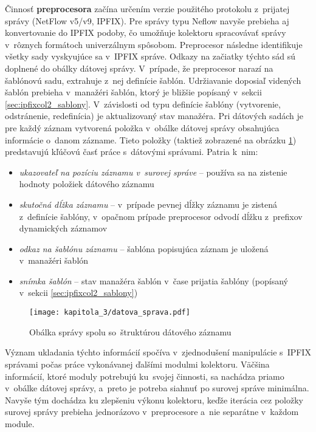 Činnosť \textbf{preprocesora} začína určením verzie použitého protokolu z~prijatej správy (Net\-Flow v5/v9, IPFIX). Pre správy typu Neflow navyše prebieha aj konvertovanie do IPFIX podoby, čo umožňuje kolektoru spracovávať správy v~rôznych formátoch univerzálnym spôsobom.
Preprocesor následne identifikuje všetky sady vyskyujúce sa v~IPFIX správe. Odkazy na začiatky týchto sád sú doplnené do obálky dátovej správy. V~prípade, že preprocesor narazí na šablónovú sadu, extrahuje z~nej definície šablón. Udržiavanie doposiaľ videných
šablón prebieha v~manažéri šablón, ktorý je bližšie popísaný v~sekcii \ref{sec:ipfixcol2_sablony}. V~závislosti od typu definície šablóny (vytvorenie, odstránenie, redefinícia) je aktualizovaný stav manažéra. Pri dátových sadách je pre každý záznam vytvorená položka v~obálke
dátovej správy obsahujúca informácie o~danom zázname. Tieto položky (taktiež zobrazené na obrázku \ref{datova_sprava}) predstavujú kľúčovú časť práce s~dátovými správami. Patria k~nim:

\begin{itemize}
    \setlength\itemsep{-0.5em}
    \item \textit{ukazovateľ na pozíciu záznamu v~surovej správe} -- používa sa na zistenie hodnoty položiek dátového záznamu
    \item \textit{skutočná dĺžka záznamu} -- v~prípade pevnej dĺžky záznamu je zistená z~definície šablóny, v~opačnom prípade preprocesor odvodí dĺžku z~prefixov dynamických záznamov
    \item \textit{odkaz na šablónu záznamu} -- šablóna popisujúca záznam je uložená v~manažéri šablón
    \item \textit{snímka šablón} -- stav manažéra šablón v~čase prijatia šablóny (popísaný v~sekcii \ref{sec:ipfixcol2_sablony})
\end{itemize}

\begin{figure}[ht]
    \centering
    \texttt{[image: kapitola\_3/datova\_sprava.pdf]}
    \caption{Obálka správy spolu so~štruktúrou dátového záznamu}
    \label{datova_sprava}
\end{figure}

Význam ukladania týchto informácií spočíva v~zjednodušení manipulácie s~IPFIX správami počas práce vykonávanej ďalšími modulmi kolektoru. Väčšina informácií, ktoré moduly potrebujú ku~svojej činnosti, sa nachádza priamo v~obálke dátovej správy, a~preto je potreba siahnuť po
surovej správe minimálna. Navyše tým dochádza ku zlepšeniu výkonu kolektoru, keďže iterácia cez položky surovej správy prebieha jednorázovo v~preprocesore a~nie separátne v~každom module.

